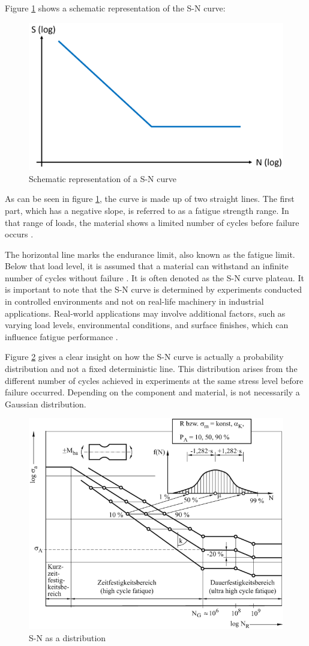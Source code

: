 Figure \ref{fig:WO} shows a schematic representation of the S-N curve: 

\begin{figure}[H]
	\centering
	\includegraphics[width=0.7\linewidth]{IMGs/WO.png}
	\caption{Schematic representation of a S-N curve}
	\label{fig:WO}
\end{figure}
\newpage
As can be seen in figure \ref{fig:WO}, the curve is made up of two straight lines. The first part, which has a negative slope, is referred to as a fatigue strength range. In that range of loads, the material shows a limited number of cycles before failure occurs \cite{Adasooriya}.

The horizontal line marks the endurance limit, also known as the fatigue limit. Below that load level, it is assumed that a material can withstand an infinite number of cycles without failure \cite{Bellows}. It is often denoted as the S-N curve plateau.
It is important to note that the S-N curve is determined by experiments conducted in controlled environments and not on real-life machinery in industrial applications. Real-world applications may involve additional factors, such as varying load levels, environmental conditions, and surface finishes, which can influence fatigue performance \cite{JanOveHolmen}. 

Figure \ref{fig:WO2} gives a clear insight on how the S-N curve is actually a probability distribution and not a fixed deterministic line. This distribution arises from the different number of cycles achieved in experiments at the same stress level before failure occurred. Depending on the component and material, is not necessarily a Gaussian distribution. 

\begin{figure}[H]
	\centering
	\includegraphics[width=0.7\linewidth]{IMGs/WO2.png}
	\caption{S-N as a distribution \cite{Klein}}
	\label{fig:WO2}
\end{figure}
\newpage

